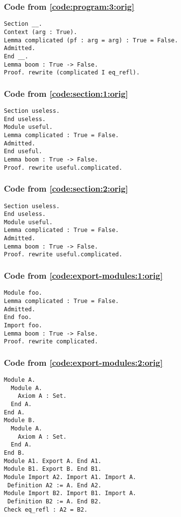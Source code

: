\documentclass[a4paper,USenglish,cleveref,autoref,thm-restate]{lipics-v2021}
\begin{document}
\subsubsection{Code from \autoref{code:program:3:orig}}\label{code:program:3}
\begin{verbatim}
Section __.
Context (arg : True).
Lemma complicated (pf : arg = arg) : True = False.
Admitted.
End __.
Lemma boom : True -> False.
Proof. rewrite (complicated I eq_refl).
\end{verbatim}

\subsubsection{Code from \autoref{code:section:1:orig}}\label{code:section:1}
\begin{verbatim}
Section useless.
End useless.
Module useful.
Lemma complicated : True = False.
Admitted.
End useful.
Lemma boom : True -> False.
Proof. rewrite useful.complicated.
\end{verbatim}

\subsubsection{Code from \autoref{code:section:2:orig}}\label{code:section:2}
\begin{verbatim}
Section useless.
End useless.
Module useful.
Lemma complicated : True = False.
Admitted.
Lemma boom : True -> False.
Proof. rewrite useful.complicated.
\end{verbatim}

\subsubsection{Code from \autoref{code:export-modules:1:orig}}\label{code:export-modules:1}
\begin{verbatim}
Module foo.
Lemma complicated : True = False.
Admitted.
End foo.
Import foo.
Lemma boom : True -> False.
Proof. rewrite complicated.
\end{verbatim}

\subsubsection{Code from \autoref{code:export-modules:2:orig}}\label{code:export-modules:2}
\begin{verbatim}
Module A.
  Module A.
    Axiom A : Set.
  End A.
End A.
Module B.
  Module A.
    Axiom A : Set.
  End A.
End B.
Module A1. Export A. End A1.
Module B1. Export B. End B1.
Module Import A2. Import A1. Import A.
 Definition A2 := A. End A2.
Module Import B2. Import B1. Import A.
 Definition B2 := A. End B2.
Check eq_refl : A2 = B2.
\end{verbatim}
\end{document}
